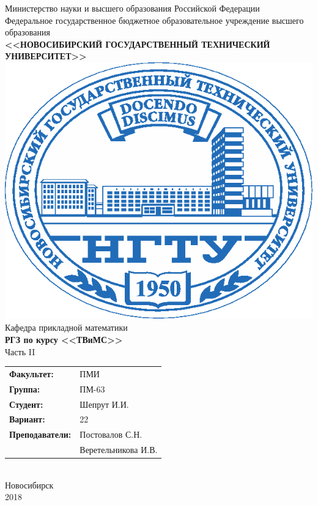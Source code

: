 \documentclass[12pt]{article}
\begin{document}
\begin{center}
\hfill \break
{\Large Министерство науки и высшего образования Российской Федерации}\\
\hfill \break
{\large Федеральное государственное бюджетное образовательное учреждение высшего образования}\\ 
{\normalsize\textbf{<<НОВОСИБИРСКИЙ ГОСУДАРСТВЕННЫЙ ТЕХНИЧЕСКИЙ УНИВЕРСИТЕТ>>}}\\
\hfill \break
\includegraphics{nstu_logo.eps}\\
{\large Кафедра прикладной математики}\\
\hfill \break
\hfill \break
\hfill \break
{\Large\textbf{РГЗ по курсу <<ТВиМС>>}}\\
\hfill \break 
{\Large Часть II}\\
\hfill \break
\hfill \break
\hfill \break
\hfill \break
\hfill \break
\begin{tabu}{ll}
\textbf{Факультет:} & ПМИ \\
\textbf{Группа:} & ПМ-63 \\
\textbf{Студент:} & Шепрут И.И. \\
\textbf{Вариант:} & 22 \\
\textbf{Преподаватели:} & Постовалов С.Н.\\
&Веретельникова И.В. \\
\end{tabu} \\
\hfill \break
\hfill \break
\hfill \break
\hfill \break
\hfill \break
\hfill \break
\hfill \break
{\large Новосибирск\\2018}
\end{center}
\thispagestyle{empty}
\newpage 
\setcounter{page}{1}
\end{document}
